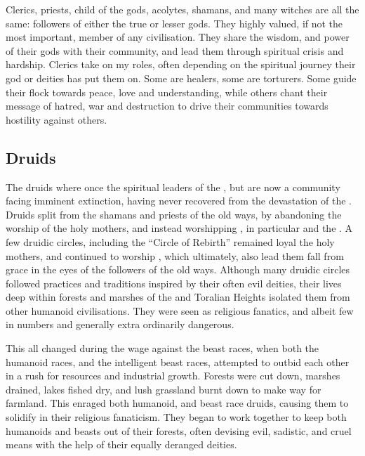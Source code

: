 Clerics, priests, child of the gods, acolytes, shamans, and many witches are
all the same: followers of either the true or lesser gods. They highly valued,
if not the most important, member of any civilisation. They share the wisdom,
and power of their gods with their community, and lead them through spiritual
crisis and hardship. Clerics take on my roles, often depending on the
spiritual journey their god or deities has put them on. Some are healers, some
are torturers. Some guide their flock towards peace, love and understanding,
while others chant their message of hatred, war and destruction to drive their
communities towards hostility against others.

\subsection{Druids}
\label{sec:Druids}

The druids where once the spiritual leaders of the , but
are now a community facing imminent extinction, having never recovered from
the devastation of the . Druids split from the
shamans and priests of the old ways, by abandoning the worship of the holy
mothers, and instead worshipping , in particular
 and the . A few druidic circles,
including the ``Circle of Rebirth'' remained loyal the holy mothers, and
continued to worship , which ultimately, also lead them
fall from grace in the eyes of the followers of the old ways. Although many
druidic circles followed practices and traditions inspired by their often evil
deities, their lives deep within forests and marshes of the
 and Toralian Heights isolated them from other humanoid
civilisations. They were seen as religious fanatics, and albeit few in numbers
and generally extra ordinarily dangerous.

This all changed during the wage against the beast races, when both the
humanoid races, and the intelligent beast races, attempted to outbid each
other in a rush for resources and industrial growth. Forests were cut down,
marshes drained, lakes fished dry, and lush grassland burnt down to make way
for farmland. This enraged both humanoid, and beast race druids, causing them
to solidify in their religious fanaticism. They began to work together to keep
both humanoids and beasts out of their forests, often devising evil, sadistic,
and cruel means with the help of their equally deranged deities.

